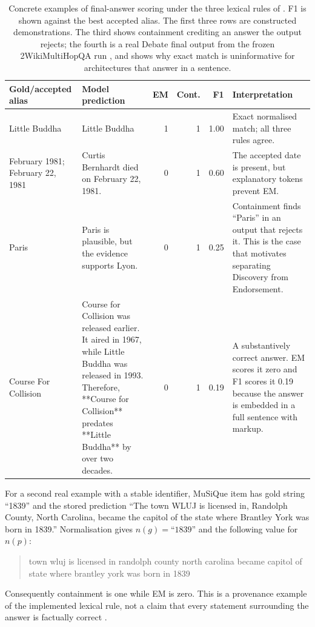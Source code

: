 \begin{table}[htbp]
  \centering
  \small
  \caption[Concrete final-answer scoring examples]{Concrete examples of final-answer scoring under the three
  lexical rules of . F1 is shown against the best accepted alias. The first three rows are constructed demonstrations. The third shows
  containment crediting an answer the output rejects; the fourth is a real Debate final output from the
  frozen 2WikiMultiHopQA run \citep{ho2020twowiki}, and shows why exact match is uninformative for architectures that answer in a
  sentence.}
  \label{tab:scoring-examples}
  \begin{tabularx}{\textwidth}{@{}>{\raggedright\arraybackslash}p{}>{\raggedright\arraybackslash}p{}rrr>{\raggedright\arraybackslash}X@{}}
    \toprule
    Gold/accepted alias & Model prediction & EM & Cont. & F1 & Interpretation \\
    \midrule
    Little Buddha & Little Buddha & 1 & 1 & 1.00 & Exact normalised match; all three rules agree. \\
    \addlinespace[0.3em]
    22 February 1981; February 22, 1981 & Curtis Bernhardt died on February 22, 1981. & 0 & 1 & 0.60 & The accepted date is present, but explanatory tokens prevent EM. \\
    \addlinespace[0.3em]
    Paris & Paris is plausible, but the evidence supports Lyon. & 0 & 1 & 0.25 & Containment finds ``Paris'' in an output that rejects it. This is the case that motivates separating Discovery from Endorsement. \\
    \addlinespace[0.3em]
    Course For Collision & Course for Collision was released earlier. It aired in 1967, while Little Buddha was released in 1993. Therefore, **Course for Collision** predates **Little Buddha** by over two decades. & 0 & 1 & 0.19 & A substantively correct answer. EM scores it zero and F1 scores it 0.19 because the answer is embedded in a full sentence with markup. \\
    \bottomrule
  \end{tabularx}
\end{table}

For a second real example with a stable identifier, MuSiQue item
 has gold string ``1839'' and the stored
prediction ``The town WLUJ is licensed in, Randolph County, North Carolina, became the capitol of the state where Brantley York was born in 1839.'' Normalisation gives $n(g)=\text{``1839''}$ and the following value for $n(p)$:
\begin{quote}
  \small\ttfamily\raggedright
  town wluj is licensed in randolph county north carolina became capitol of state where brantley york was born in 1839
\end{quote}
Consequently containment is one while EM is zero. This is a provenance example of the implemented lexical rule, not a claim that every statement surrounding the answer is factually correct \citep{trivedi2022musique}.

